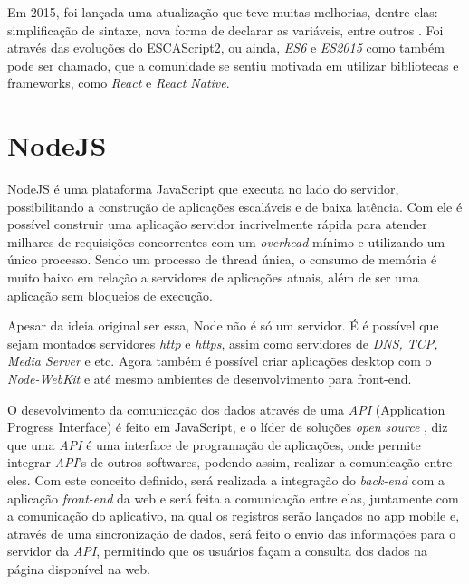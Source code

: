 Em 2015, foi lançada uma atualização que teve muitas melhorias, dentre elas: simplificação de sintaxe, nova forma de declarar as variáveis, entre outros \cite{ecma}.
Foi através das evoluções do ESCAScript2, ou ainda, \textit{ES6} e \textit{ES2015} como também pode ser chamado, que a comunidade se sentiu motivada em utilizar bibliotecas e frameworks, como \textit{React} e \textit{React Native}. 


\section{NodeJS}
NodeJS é uma plataforma JavaScript que executa no lado do servidor, possibilitando a construção de aplicações escaláveis e de baixa latência. Com ele é possível construir uma aplicação servidor incrivelmente rápida para atender milhares de requisições concorrentes com um \textit{overhead} mínimo e utilizando um único processo. Sendo um processo de thread única, o consumo de memória é muito baixo em relação a servidores de aplicações atuais, além de ser uma aplicação sem bloqueios de execução. \cite{node}

Apesar da ideia original ser essa, Node não é só um servidor. É é possível que sejam montados servidores \textit{http} e  \textit{https}, assim como servidores de  \textit{DNS, TCP, Media Server} e etc. Agora também é possível criar aplicações desktop com o  \textit{Node-WebKit} e até mesmo ambientes de desenvolvimento para front-end. \cite{node1}



O desevolvimento da comunicação dos dados através de uma \textit{API} (Application Progress Interface) é feito em JavaScript,  e o líder de soluções \textit{open source} , diz que uma \textit{API} é uma interface de programação de aplicações, onde permite integrar \textit{API}'s de outros softwares, podendo assim, realizar a comunicação entre eles. Com este conceito definido, será realizada a integração do \textit{back-end} com a aplicação \textit{front-end} da web e será feita a comunicação entre elas, juntamente com a comunicação do aplicativo, na qual os registros serão lançados no app mobile e, através de uma sincronização de dados, será feito o envio das informações para o servidor da \textit{API}, permitindo que os usuários façam a consulta dos dados na página disponível na web.

